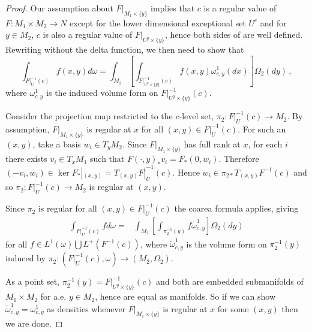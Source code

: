 \begin{proof}
Our assumption about $F|_{M_1\times\{y\}}$ implies that $c$ is a regular value of $F:M_1\times M_2\rightarrow N$ except for the lower dimensional exceptional set $U^c$ and for $y\in M_2$, $c$ is also a regular value of $F|_{U^y\times\{y\}}$, hence both sides of  are well defined.  Rewriting  without the delta function, we then need to show that 
\begin{equation}
\int_{F|_U^{-1}(c)} f(x,y) d\omega=\int_{M_2}\left[\int_{F|_{U^y\times\{y\}}^{-1}(c)} f(x,y) \omega^1_{c,y}(dx)\right]\Omega_2(dy)\,,
\end{equation}
where $\omega^1_{c,y}$ is the induced volume form on $F|_{U^y\times\{y\}}^{-1}(c)$.  

Consider the projection map restricted to the $c$-level set, $\pi_2:F|_U^{-1}(c)\rightarrow M_2$.  By assumption, $F|_{M_1\times\{y\}}$ is regular at $x$ for all $(x,y)\in F|_U^{-1}(c)$. For such an $(x,y)$, take a basis $w_i\in T_yM_2$. Since $F|_{M_1\times\{y\}}$ has full rank at $x$, for each $i$ there exists $v_i\in T_xM_1$ such that $F(\cdot,y)_*v_i=F_*(0,w_i)$.  Therefore $(-v_i,w_i)\in \ker F_*|_{(x,y)}=T_{(x,y)}F|_U^{-1}(c)$.  Hence $w_i\in\pi_{2*} T_{(x,y)}F^{-1}(c)$ and so $\pi_2:F|_U^{-1}(c)\rightarrow M_2$ is regular at $(x,y)$.  

Since $\pi_2$ is regular for all $(x,y)\in F|_U^{-1}(c)$ the coarea formula applies, giving
\begin{align}
\int_{F|_U^{-1}(c)}f d\omega=&\int_{M_2}\left[\int_{\pi_2^{-1}(y)}f\tilde{\omega}_{c,y}^1\right]\Omega_2(dy)
\end{align}
for all $f\in L^1(\omega)\bigcup L^+(F^{-1}(c))$, where $\tilde{\omega}_{c,y}^1$ is the volume form on $\pi_2^{-1}(y)$ induced by $\pi_2:(F|_U^{-1}(c),\omega)\rightarrow (M_2,\Omega_2)$.

As a point set, $\pi_2^{-1}(y)=F|_{ U^y\times\{y\}}^{-1}(c)$ and both are embedded submanifolds of $M_1\times M_2$ for a.e. $y\in M_2$, hence are equal as manifolds.  So if we can show $\tilde{\omega}_{c,y}^1=\omega^1_{c,y}$ as densities whenever $F|_{M_1\times\{y\}}$ is regular at $x$ for some $(x,y)$ then we are done.  


\end{proof}
